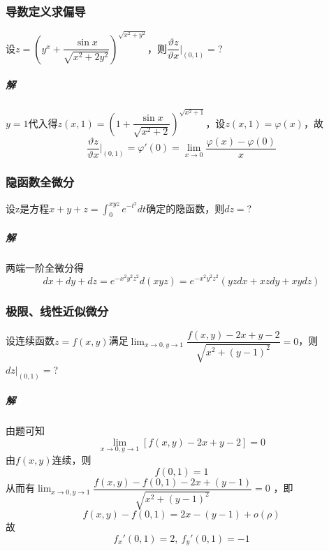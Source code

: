 \subsubsection{导数定义求偏导}
设\(z = (y^x + \dfrac{\sin x}{\sqrt{x^2 + 2y^2}})^{\sqrt{x^2 + y^2}}\)，则\(\dfrac{\vartheta z}{\vartheta x}\bigg|_{(0, 1)} = \)?
\subparagraph{解}
\(y = 1\)代入得\(z(x, 1) = (1 + \dfrac{\sin x}{\sqrt{x^2 + 2}})^{\sqrt{x^2 + 1}}\)，设\(z(x, 1) = \varphi(x)\)，故\[\dfrac{\vartheta z}{\vartheta x}\bigg|_{(0, 1)} = \varphi'(0) = \lim_{x \to 0}\dfrac{\varphi(x) - \varphi(0)}{x}\]


\subsubsection{隐函数全微分}
设z是方程\(x + y + z = \displaystyle\int_0^{xyz}e^{-t^2}dt\)确定的隐函数，则\(dz = \)?
\subparagraph{解}
两端一阶全微分得\[dx + dy + dz = e^{-x^2y^2z^2}d(xyz) = e^{-x^2y^2z^2}(yzdx + xzdy + xydz)\]


\subsubsection{极限、线性近似微分}
设连续函数\(z = f(x, y)\)满足\(\displaystyle\lim_{x \to 0, y \to 1}\dfrac{f(x, y) - 2x + y - 2}{\sqrt{x^2 + (y - 1)^2}} = 0\)，则\(dz\bigg|_{(0, 1)} = \)?
\subparagraph{解}
由题可知\[\displaystyle\lim_{x \to 0, y \to 1}[f(x, y) - 2x + y - 2] = 0\]
由\(f(x, y)\)连续，则\[f(0, 1) = 1\]
从而有\(\displaystyle\lim_{x \to 0, y \to 1}\dfrac{f(x, y) - f(0, 1) - 2x + (y - 1)}{\sqrt{x^2 + (y - 1)^2}} = 0\)
，即\[f(x, y) - f(0, 1) = 2x - (y - 1) + o(\rho)\]
故\[f_x'(0, 1) = 2,\ f_y'(0, 1) = -1\]





